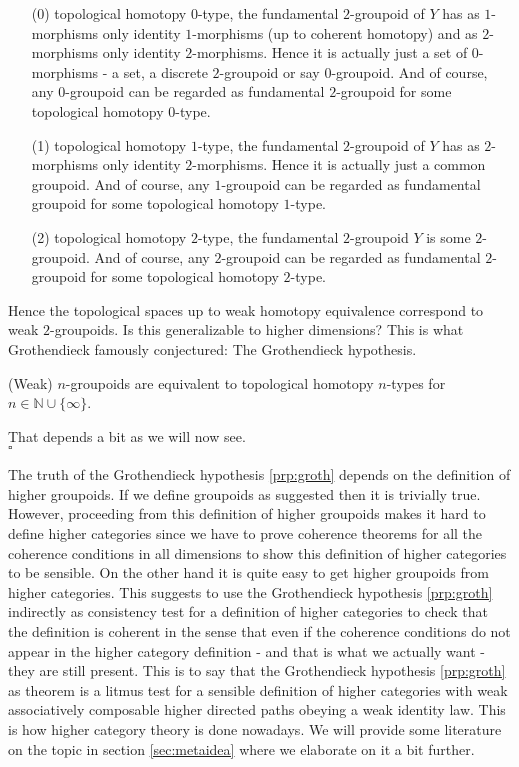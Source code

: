 \begin{enumerate}
\item[(0)]
topological homotopy $0$-type, the fundamental $2$-groupoid of $Y$ has as $1$-morphisms only identity $1$-morphisms (up to coherent homotopy) and as $2$-morphisms only identity $2$-morphisms. Hence it is actually just a set of $0$-morphisms - a set, a discrete $2$-groupoid or say $0$-groupoid. And of course, any $0$-groupoid can be regarded as fundamental $2$-groupoid for some topological homotopy $0$-type.
\item[(1)]
topological homotopy $1$-type, the fundamental $2$-groupoid of $Y$ has as $2$-morphisms only identity $2$-morphisms. Hence it is actually just a common groupoid. And of course, any $1$-groupoid can be regarded as fundamental groupoid for some topological homotopy $1$-type.
\item[(2)]
topological homotopy $2$-type, the fundamental $2$-groupoid $Y$ is some $2$-groupoid. And of course, any $2$-groupoid can be regarded as fundamental $2$-groupoid for some topological homotopy $2$-type.
\end{enumerate}
Hence the topological spaces up to weak homotopy equivalence correspond to weak $2$-groupoids. Is this generalizable to higher dimensions? This is what Grothendieck famously conjectured: The Grothendieck hypothesis.
\\
\begin{prp}[Grothendieck]
\label{prp:groth}
(Weak) $n$-groupoids are equivalent to topological homotopy $n$-types for $n \in \mathbb{N} \cup \lbrace \infty \rbrace$.
\end{prp}
\begin{prf}
That depends a bit as we will now see.
\\
\phantom{proven}
\hfill
$\square$
\end{prf}
The truth of the Grothendieck hypothesis \ref{prp:groth} depends on the definition of higher groupoids. If we define groupoids as suggested then it is trivially true. However, proceeding from this definition of higher groupoids makes it hard to define higher categories since we have to prove coherence theorems for all the coherence conditions in all dimensions to show this definition of higher categories to be sensible. On the other hand it is quite easy to get higher groupoids from higher categories. This suggests to use the Grothendieck hypothesis \ref{prp:groth} indirectly as consistency test for a definition of higher categories to check that the definition is coherent in the sense that even if the coherence conditions do not appear in the higher category definition - and that is what we actually want - they are still present. This is to say that the Grothendieck hypothesis \ref{prp:groth} as theorem is a litmus test for a sensible definition of higher categories with weak associatively composable higher directed paths obeying a weak identity law. This is how higher category theory is done nowadays. We will provide some literature on the topic in section \ref{sec:metaidea} where we elaborate on it a bit further.
